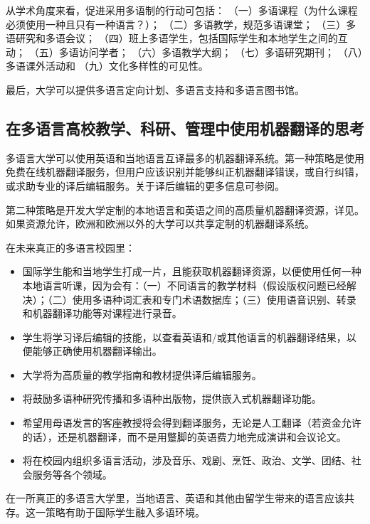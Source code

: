 \documentclass[output=paper]{langscibook}
\begin{document}
从学术角度来看，促进采用多语制的行动可包括：
（一）多语课程（为什么课程必须使用一种且只有一种语言？）；
（二）多语教学，规范多语课堂；
（三）多语研究和多语会议；
（四）班上多语学生，包括国际学生和本地学生之间的互动；
（五）多语访问学者；
（六）多语教学大纲；
（七）多语研究期刊；
（八）多语课外活动和
（九）文化多样性的可见性。

最后，大学可以提供多语言定向计划、多语言支持和多语言图书馆。



\subsection{在多语言高校教学、科研、管理中使用机器翻译的思考}
多语言大学可以使用英语和当地语言互译最多的机器翻译系统。第一种策略是使用免费在线机器翻译服务，但用户应该识别并能够纠正机器翻译错误，或自行纠错，或求助专业的译后编辑服务。关于译后编辑的更多信息可参阅。

第二种策略是开发大学定制的本地语言和英语之间的高质量机器翻译资源，详见。如果资源允许，欧洲和欧洲以外的大学可以共享定制的机器翻译系统。

在未来真正的多语言校园里：

\begin{itemize}
\item 国际学生能和当地学生打成一片，且能获取机器翻译资源，以便使用任何一种本地语言听课，因为会有：（一）不同语言的教学材料（假设版权问题已经解决）；（二）使用多语种词汇表和专门术语数据库；（三）使用语音识别、转录和机器翻译功能等对课程进行录音。
\end{itemize}
\begin{itemize}
\item 学生将学习译后编辑的技能，以查看英语和/或其他语言的机器翻译结果，以便能够正确使用机器翻译输出。
\item 大学将为高质量的教学指南和教材提供译后编辑服务。
\item 将鼓励多语种研究传播和多语种出版物，提供嵌入式机器翻译功能。
\item 希望用母语发言的客座教授将会得到翻译服务，无论是人工翻译（若资金允许的话），还是机器翻译，而不是用蹩脚的英语费力地完成演讲和会议论文。
\item 将在校园内组织多语言活动，涉及音乐、戏剧、烹饪、政治、文学、团结、社会服务等各个领域。
\end{itemize}

\begin{sloppypar}
在一所真正的多语言大学里，当地语言、英语和其他由留学生带来的语言应该共存。这一策略有助于国际学生融入多语环境。
\end{sloppypar}
\end{document}
